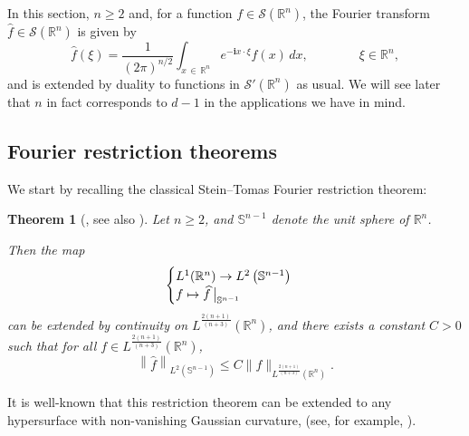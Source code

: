 \documentclass[10pt]{amsart}
\newtheorem{theo}{Theorem}[section]
\theoremstyle{definition}\newtheorem{defi}[theo]{Definition}\newtheorem{rema}[theo]{Remark}\newtheorem{exam}[theo]{Example}\newtheorem{exem}[theo]{Example}\newtheorem{nota}[theo]{Notation}
\newcommand{\scS}{\mathscr{S}}
\newcommand*\R{\mathbb{R}}
\renewcommand*\S{\mathbb{S}}
\renewcommand{\i}{\mathbf{i}}
\renewcommand{\geq}{\geqslant}
\renewcommand{\hat}{\widehat}
\let\oldhat\hat
\renewcommand*{\hat}[1]{\mathchoice{\widehat{#1}}{\widehat{#1}}{\oldhat{#1}}{\oldhat{#1}}}
\begin{document}
In this section, $n \geq 2$ and, for a function $f \in \scS(\R^n)$, the Fourier transform $\widehat f \in \scS(\R^n)$ is given by
\begin{equation*}
\widehat f(\xi) = \frac{1}{(2\pi)^{n/2}} \int_{x\, \in\,\R^n} e^{- \i x \cdot \xi} f(x) \, dx, \qquad \qquad\xi \in \R^n,
\end{equation*}
and is extended by duality to functions in $\scS'(\R^n)$ as usual. We will see later that $n$ in fact corresponds to $d-1$ in the applications we have in mind.

\subsection{Fourier restriction theorems}

We start by recalling the classical Stein--Tomas Fourier restriction theorem:
\begin{theo}
[{\cite{tomas1975restriction}, see also \cite[Theorem~2, p.~352]{stein1993harmonic}}]\label{Thm-Stein-Tomas}
Let $n\geqslant 2$, and $\S^{n-1}$ denote the unit sphere of $\R^n$.

Then the map
\begin{equation*}
\begin{cases}
L^1(\R^n) \to L^2\left(\S^{n-1}\right)
\\
f \mapsto \hat f\, \big|_{\S^{n-1}}
\end{cases}
\end{equation*}
can be extended by continuity on $L^{\frac{2(n+1)}{(n+3)}}(\R^n)$, and there exists a constant $C>0$ such that for all $f \in L^{\frac{2(n+1)}{(n+3)}}(\R^n)$,
\begin{equation*}
\left\| \widehat f \right\|_{L^2\left(\S^{n-1}\right)} \leqslant C \|f\|_{L^{\frac{2(n+1)}{(n+3)}}\left(\R^n\right)}.
\end{equation*}
\end{theo}

It is well-known that this restriction theorem can be extended to any hypersurface with non-vanishing Gaussian curvature, (see, for example, \cite[Corollary~2.2.2]{sogge2017fourier}).
\end{document}
